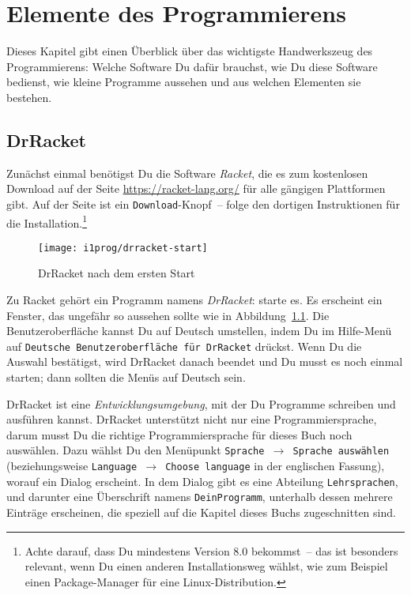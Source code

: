 
\chapter{Elemente des Programmierens}
\label{cha:whats-programming}

Dieses Kapitel gibt einen Überblick über das wichtigste Handwerkszeug
des Programmierens: Welche Software Du dafür brauchst, wie Du diese
Software bedienst, wie kleine Programme aussehen und aus welchen
Elementen sie bestehen.

\section{DrRacket}

Zunächst einmal benötigst Du die Software \textit{Racket}, die es zum
kostenlosen Download auf der Seite \url{https://racket-lang.org/} für
alle gängigen Plattformen gibt.  Auf der Seite ist ein
\texttt{Download}-Knopf~-- folge den dortigen Instruktionen für die
Installation.\footnote{Achte darauf, dass Du mindestens Version 8.0
bekommst~-- das ist besonders relevant, wenn Du einen anderen
Installationsweg wählst, wie zum Beispiel einen Package-Manager für
eine Linux-Distribution.}

\begin{figure}[tb]
  \centering
  \texttt{[image: i1prog/drracket-start]}
  \caption{DrRacket nach dem ersten Start}
  \label{fig:drracket-start}
\end{figure}

Zu Racket gehört ein Programm namens
\textit{DrRacket}: starte es.  Es erscheint ein
Fenster, das ungefähr so aussehen sollte wie in
Abbildung~\ref{fig:drracket-start}.  Die Benutzeroberfläche kannst
Du auf Deutsch umstellen, indem Du im Hilfe-Menü auf \texttt{Deutsche
  Benutzeroberfläche für DrRacket} drückst.  Wenn Du die Auswahl
bestätigst, wird DrRacket danach beendet und Du musst es noch einmal
starten; dann sollten die Menüs auf Deutsch sein.

DrRacket ist eine \textit{Entwicklungsumgebung}, mit der Du Programme
schreiben und ausführen kannst.  DrRacket unterstützt nicht nur eine
Programmiersprache, darum musst Du die richtige Programmiersprache für
dieses Buch noch auswählen.  Dazu wählst Du den Menüpunkt
\texttt{Sprache $\rightarrow$ Sprache auswählen} (beziehungsweise
\texttt{Language $\rightarrow$ Choose language} in der englischen
Fassung), worauf ein Dialog erscheint.  In dem Dialog gibt es eine
Abteilung \texttt{Lehrsprachen}, und darunter eine
Überschrift namens \texttt{DeinProgramm}, unterhalb dessen mehrere
Einträge erscheinen, die speziell auf die Kapitel dieses Buchs
zugeschnitten sind.

